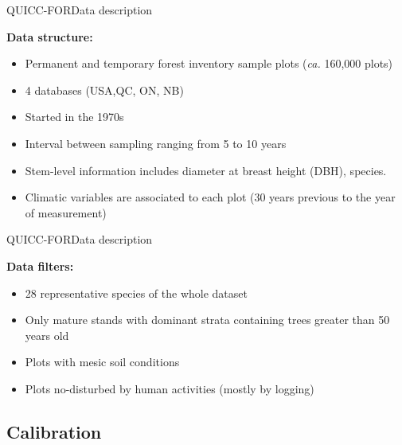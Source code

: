 \documentclass[table]{eecslides}
\begin{document}
\begin{frame}{QUICC-FOR}{Data description}

\textbf{Data structure:}
	\begin{itemize}
		\item Permanent and temporary forest inventory sample plots (\textit{ca.} 160,000 plots)
		\item 4 databases (USA,QC, ON, NB)
		\item Started in the 1970s
		\item Interval between sampling ranging from 5 to 10 years
		\item Stem-level information includes diameter at breast height (DBH), species.
		\item Climatic variables are associated to each plot (30 years previous to the year of measurement)
	\end{itemize}

\end{frame}


\begin{frame}{QUICC-FOR}{Data description}

\textbf{Data filters:}
	\begin{itemize}
		\item 28 representative species of the whole dataset
		\item Only mature stands with dominant strata containing trees greater than 50 years old
		\item Plots with mesic soil conditions
		\item Plots no-disturbed by human activities (mostly by logging)
	\end{itemize}

\end{frame}

\subsection{Calibration}
\end{document}
